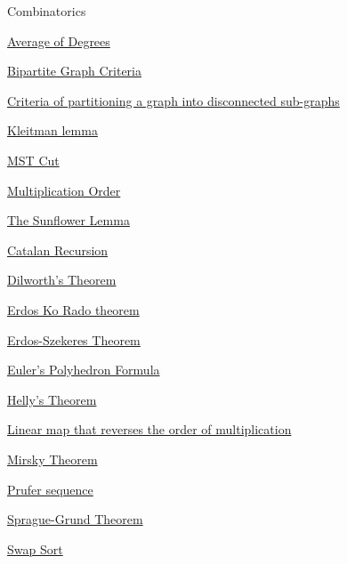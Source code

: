 \scriptsize

\newpage Combinatorics


\hyperref  [lemma:]{}

\hyperref  [lemma:]{}

\hyperref  [lemma:]{}

\hyperref  [lemma:]{}

\hyperref  [lemma:]{}

\hyperref  [lemma:]{}

\hyperref  [lemma:]{}

\hyperref  [lemma:Average of Degrees]{Average of Degrees}

\hyperref  [lemma:Bipartite Graph Criteria]{Bipartite Graph Criteria}

\hyperref  [lemma:Criteria of partitioning a graph into disconnected sub-graphs]{Criteria of partitioning a graph into disconnected sub-graphs}

\hyperref  [lemma:Kleitman lemma]{Kleitman lemma}

\hyperref  [lemma:MST Cut]{MST Cut}

\hyperref  [lemma:Multiplication Order]{Multiplication Order}

\hyperref  [lemma:The Sunflower Lemma]{The Sunflower Lemma}

\hyperref  [theorem:]{}

\hyperref  [theorem:]{}

\hyperref  [theorem:Catalan Recursion]{Catalan Recursion}

\hyperref  [theorem:Dilworth's Theorem]{Dilworth's Theorem}

\hyperref  [theorem:Erdos Ko Rado theorem]{Erdos Ko Rado theorem}

\hyperref  [theorem:Erdos-Szekeres Theorem]{Erdos-Szekeres Theorem}

\hyperref  [theorem:Euler's Polyhedron Formula]{Euler's Polyhedron Formula}

\hyperref  [theorem:Helly's Theorem]{Helly's Theorem}

\hyperref  [theorem:Linear map that reverses the order of multiplication]{Linear map that reverses the order of multiplication}

\hyperref  [theorem:Mirsky Theorem]{Mirsky Theorem}

\hyperref  [theorem:Prufer sequence]{Prufer sequence}

\hyperref  [theorem:Sprague-Grund Theorem]{Sprague-Grund Theorem}

\hyperref  [theorem:Swap Sort]{Swap Sort}

